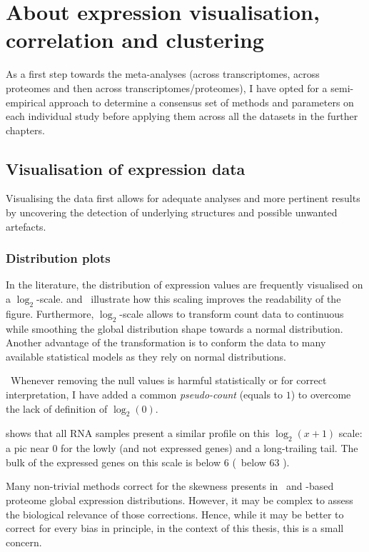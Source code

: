 \chapter{About expression visualisation, correlation and clustering}
\label{ch:expression}

As a first step towards the meta-analyses (across transcriptomes, across
proteomes and then across transcriptomes/proteomes),
I have opted for a semi-empirical approach to determine
a consensus set of methods and parameters on each individual study
before applying them across all the datasets in the further chapters.


\section{Visualisation of expression data}

Visualising the data first allows for adequate analyses
and more pertinent results by uncovering
the detection of underlying structures and possible unwanted artefacts.

\subsection{Distribution plots}

In the literature, the distribution of expression values are frequently
visualised on a $\log_{2}$-scale.
 and~ illustrate how
this scaling improves the readability of the figure.
Furthermore, $\log_{2}$-scale allows to transform count data to continuous
while smoothing the global distribution shape towards a normal distribution.
Another advantage of the transformation is to conform the data to many available
statistical models as they rely on normal distributions.

\NB\ Whenever removing the null values is harmful statistically
or for correct interpretation,
I have added a common \emph{pseudo-count} (equals to $1$)
to overcome the lack of definition of $\log_{2}(0)$.

 shows that all \gls{RNA} samples present a similar
profile on this $\log_{2}(x+1)$ scale:
a pic near $0$ for the lowly (and not expressed genes) and a long-trailing tail.
The bulk of the expressed genes on this scale is below $6$ (\ie\ below 63 \FPKM).

Many non-trivial methods correct for the skewness presents in
\Rnaseq\ and \ms-based proteome global expression distributions.
However, it may be complex to assess the biological relevance of those corrections.
Hence, while it may be better to correct for every bias in principle,
in the context of this thesis, this is a small concern.

